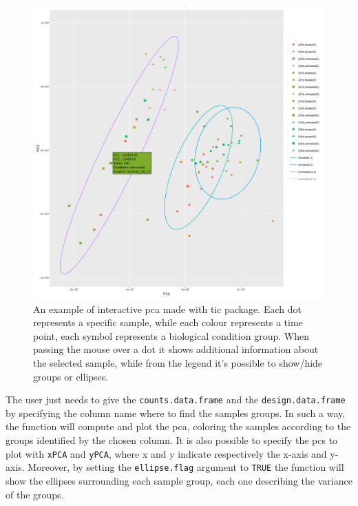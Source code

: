 \begin{figure}[H]
\centering
\includegraphics[width=\textwidth, keepaspectratio]{img/ticorser/pca_example.png}
\caption[ticorser pca]{An example of interactive \gls{pca} made with \gls{tic} package. Each dot represents a specific sample, while each colour represents a time point, each symbol represents a biological condition group. When passing the mouse over a dot it shows additional information about the selected sample, while from the legend it's possible to show/hide groups or ellipses.}
\label{fig:ticorserpca}

\end{figure}


The user just needs to give the \lstinline!counts.data.frame! and the \lstinline!design.data.frame! by specifying the column name where to find the samples groups.
In such a way, the function will compute and plot the \gls{pca}, coloring the samples according to the groups identified by the chosen column.
It is also possible to specify the \glspl{pc} to plot with \lstinline!xPCA! and \lstinline!yPCA!, where x and y indicate respectively the x-axis and y-axis.
Moreover, by setting the \lstinline!ellipse.flag! argument to \lstinline!TRUE!  the function will show the ellipses surrounding each sample group, each one describing the variance of the groups.

